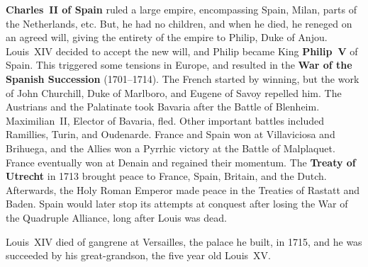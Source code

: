 \textbf{Charles~II of Spain} ruled a large empire, encompassing Spain, Milan, parts of the Netherlands, etc.
But, he had no children, and when he died, he reneged on an agreed will,
giving the entirety of the empire to Philip, Duke of Anjou.
Louis~XIV decided to accept the new will, and Philip became King \textbf{Philip~V} of Spain.
This triggered some tensions in Europe, and resulted in the \textbf{War of the Spanish Succession} (1701--1714).
The French started by winning, but the work of John Churchill, Duke of Marlboro, and Eugene of Savoy repelled him.
The Austrians and the Palatinate took Bavaria after the Battle of Blenheim.
Maximilian~II, Elector of Bavaria, fled.
Other important battles included Ramillies, Turin, and Oudenarde.
France and Spain won at Villaviciosa and Brihuega,
and the Allies won a Pyrrhic victory at the Battle of Malplaquet.
France eventually won at Denain and regained their momentum.
The \textbf{Treaty of Utrecht} in 1713 brought peace to France, Spain, Britain, and the Dutch.
Afterwards, the Holy Roman Emperor made peace in the Treaties of Rastatt and Baden.
Spain would later stop its attempts at conquest after losing the War of the Quadruple Alliance,
long after Louis was dead.

Louis~XIV died of gangrene at Versailles, the palace he built, in 1715,
and he was succeeded by his great-grandson, the five year old Louis~XV\@.
